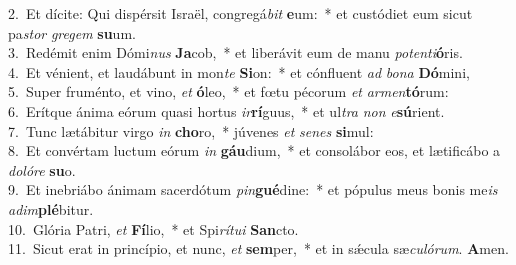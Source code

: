 {2.~}Et dícite: Qui dispérsit Israël, congregá\textit{bit} \textbf{e}um:~* et custódiet eum sicut pa\textit{stor} \textit{gre}\textit{gem} \textbf{su}um.\\
{3.~}Redémit enim Dómi\textit{nus} \textbf{Ja}cob,~* et liberávit eum de manu \textit{po}\textit{ten}\textit{ti}\textbf{ó}ris.\\
{4.~}Et vénient, et laudábunt in mon\textit{te} \textbf{Si}on:~* et cónfluent \textit{ad} \textit{bo}\textit{na} \textbf{Dó}mini,\\
{5.~}Super fruménto, et vino, \textit{et} \textbf{ó}leo,~* et fœtu pécorum \textit{et} \textit{ar}\textit{men}\textbf{tó}rum:\\
{6.~}Erítque ánima eórum quasi hortus \textit{ir}\textbf{rí}guus,~* et ul\textit{tra} \textit{non} \textit{e}\textbf{sú}rient.\\
{7.~}Tunc lætábitur virgo \textit{in} \textbf{cho}ro,~* júvenes \textit{et} \textit{se}\textit{nes} \textbf{si}mul:\\
{8.~}Et convértam luctum eórum \textit{in} \textbf{gáu}dium,~* et consolábor eos, et lætificábo a \textit{do}\textit{ló}\textit{re} \textbf{su}o.\\
{9.~}Et inebriábo ánimam sacerdótum \textit{pin}\textbf{gué}dine:~* et pópulus meus bonis me\textit{is} \textit{a}\textit{dim}\textbf{plé}bitur.\\
{10.~}Glória Patri, \textit{et} \textbf{Fí}lio,~* et Spi\textit{rí}\textit{tu}\textit{i} \textbf{San}cto.\\
{11.~}Sicut erat in princípio, et nunc, \textit{et} \textbf{sem}per,~* et in sǽcula sæ\textit{cu}\textit{ló}\textit{rum}. \textbf{A}men.\\
